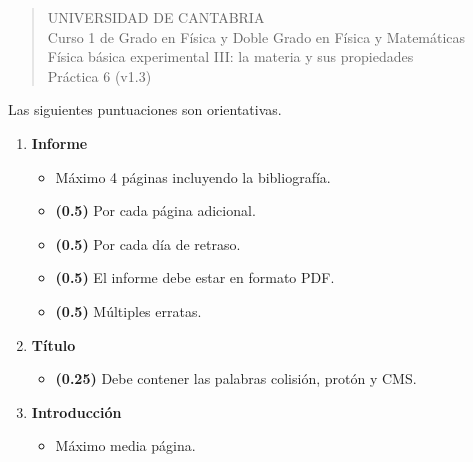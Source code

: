 \documentclass[11pt]{articulo}
\begin{document}
\begin{verse}
{\Large UNIVERSIDAD DE CANTABRIA}\\ 
\vspace*{0.5cm}
{\normalsize \rm Curso 1 de Grado en F\'isica y Doble Grado en F\'isica y Matem\'aticas}\\
{\normalsize \rm F\'isica b\'asica experimental III: la materia y sus propiedades}\\ 
{\normalsize \rm Pr\'actica 6 (v1.3)}\\
\end{verse} 

\vspace*{0.25cm}

Las siguientes puntuaciones son orientativas.

\begin{enumerate}

\item {\bf Informe}

\begin{itemize}

\item M\'aximo 4 p\'aginas incluyendo la bibliograf\'ia.

\item {\bf (0.5)} Por cada p\'agina adicional.

\item {\bf (0.5)} Por cada d\'ia de retraso.

\item {\bf (0.5)} El informe debe estar en formato PDF.

\item {\bf (0.5)} M\'ultiples erratas.

\end{itemize}

\item {\bf T\'itulo}

\begin{itemize}

\item {\bf (0.25)} Debe contener las palabras colisi\'on, prot\'on y CMS.

\end{itemize}

\item {\bf Introducci\'on}

\begin{itemize}

\item M\'aximo media p\'agina.


\end{itemize}
\end{enumerate}
\end{document}
